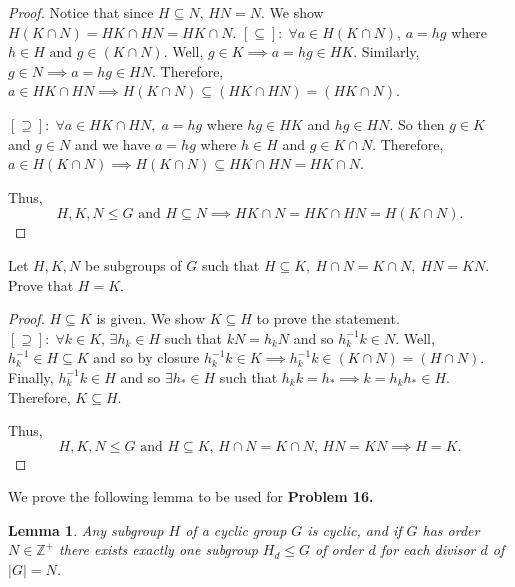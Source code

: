 \documentclass[addpoints,10pt]{exam}
\theoremstyle{plain}
\theoremstyle{definition}
\newtheorem{prob}[thm]{Problem}
\theoremstyle{plain}
\theoremstyle{plain}
\newtheorem*{lem*}{Lemma}
\theoremstyle{definition}
\let\oldprob\prob
\let\endoldprob\endprob
\renewenvironment{prob}
  {\begin{singlespace}\oldprob}
  {\endoldprob\end{singlespace}}
\newcommand{\belowtitle}{\leavevmode\newline}
\newcommand{\ZZ}{\ensuremath{\mathbb{Z}}}
\begin{document}
\begin{proof}
  Notice that since $H\subseteq N,\, HN=N$. We show $H(K\cap N)=HK\cap HN=HK\cap N.$\belowtitle
  $\mathbf{[\subseteq]:\;} \forall a\in H(K\cap N),\,a=hg$ where $h\in H\text{ and }g\in (K\cap N).$ Well, $g\in K\implies a=hg\in HK.$ Similarly, $g\in N \implies a=hg\in HN.$ Therefore, $a\in HK\cap HN\implies H(K\cap N)\subseteq (HK\cap HN)=(HK\cap N)$.

  $\mathbf{[\supseteq]:\;} \forall a\in HK\cap HN,\;a=hg$ where $hg\in HK$ and $hg\in HN.$ So then $g\in K$ and $g\in N$ and we have $a=hg$ where $h\in H$ and $g\in K\cap N$. Therefore, $a\in H(K\cap N)\implies H(K\cap N)\subseteq HK\cap HN=HK\cap N$.

  Thus,
  $$H,K,N\leq G\text{ and }H\subseteq N\implies HK\cap N=HK\cap HN=H(K\cap N).$$

\end{proof}
\newpage

\begin{prob}
  Let $H,K,N$ be subgroups of $G$ such that $H\subseteq K,\ H\cap N=K\cap N,\ HN=KN$. Prove that $H=K$.
\end{prob}

\begin{proof}
  $H\subseteq K$ is given. We show $K\subseteq H$ to prove the statement.\belowtitle
  $\mathbf{[\supseteq]:\;} \forall k\in K,\,\exists h_{k}\in H$ such that $kN=h_{k}N$ and so $h_{k}^{-1}k\in N.$ Well, $h_{k}^{-1}\in H\subseteq K$ and so by closure $h_{k}^{-1}k\in K\implies h_{k}^{-1}k\in (K\cap N)=(H\cap N).$ Finally, $h_{k}^{-1}k\in H$ and so $\exists h_{*}\in H$ such that $h_{k}k=h_{*}\implies k=h_{k}h_{*}\in H.$ Therefore, $K\subseteq H.$

  Thus,
  $$H,K,N\leq G\text{ and }H\subseteq K,\,H\cap N=K\cap N,\, HN=KN\implies H=K.$$
\end{proof}
\newpage
We prove the following lemma to be used for \textbf{Problem 16.}

\begin{lem*}
  Any subgroup $H$ of a cyclic group $G$ is cyclic, and if $G$ has order $N\in \ZZ^{+}$ there exists exactly one subgroup $H_{d}\leq G$ of order $d$ for each divisor $d$ of $|G|=N$.
\end{lem*}
\end{document}
